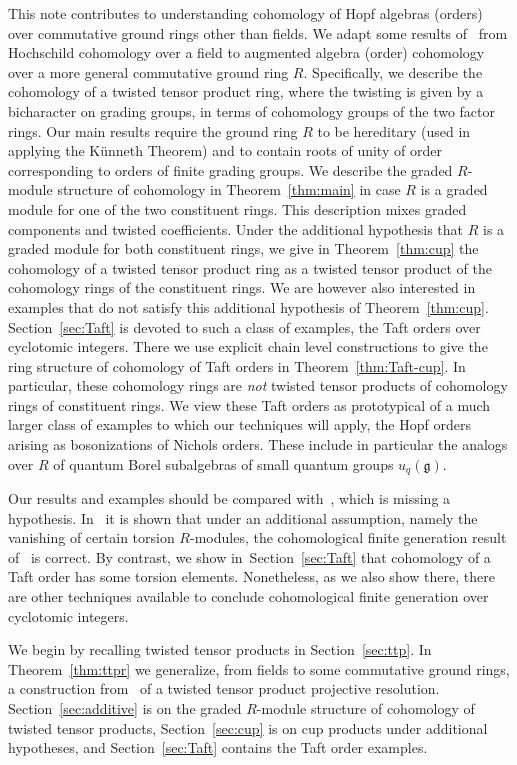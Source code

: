 \documentclass[11pt]{amsart}
\numberwithin{equation}{section}
\theoremstyle{definition}
\theoremstyle{remark}
\begin{document}
This note contributes to understanding 
cohomology of Hopf algebras (orders)
over commutative ground rings other than fields.
We adapt some results of~\cite{BW} from Hochschild cohomology
over a field to augmented algebra (order) cohomology over a 
more general commutative ground ring $R$.
Specifically, we describe the cohomology of a twisted tensor product ring,
where the twisting is given by a bicharacter on grading groups,
in terms of cohomology groups of the two factor rings.
Our main results require the ground ring $R$ to be hereditary 
(used in applying the K\"unneth Theorem) and to contain roots of unity 
of order corresponding to orders of finite grading groups.
We describe the
graded $R$-module structure of cohomology in Theorem~\ref{thm:main}
in case $R$ is a graded module for one of the two constituent rings.
This description mixes graded components and twisted coefficients.  
Under the additional hypothesis that $R$ is a graded module
for both constituent rings, we give in Theorem~\ref{thm:cup}
the cohomology of a twisted tensor product ring 
as a twisted tensor product of the cohomology rings of the constituent rings.
We are however also interested in examples
that do not satisfy this additional hypothesis of Theorem~\ref{thm:cup}.
Section~\ref{sec:Taft} is devoted to such a class of examples,
the Taft orders over cyclotomic integers.
There we use explicit chain level constructions to give the ring structure
of cohomology of Taft orders in Theorem~\ref{thm:Taft-cup}. 
In particular, these cohomology rings are {\em not} twisted tensor products
of cohomology rings of constituent rings. 
We view these Taft orders as prototypical of 
a much larger class of examples to which our techniques will apply, the
Hopf orders arising as bosonizations of Nichols orders.
These include in particular the analogs over $R$ of quantum Borel
subalgebras of small quantum groups $u_q(\mathfrak{g})$. 

Our results and examples should be compared with~\cite[Theorem 5.5]{NWW},
which is missing a hypothesis.
In~\cite{NWW-corrigendum} it is shown that under an additional assumption,
namely the vanishing of certain torsion $R$-modules,
the cohomological finite generation result of~\cite[Theorem 5.5]{NWW} is correct. 
By contrast, we show in~Section~\ref{sec:Taft}
that cohomology of a Taft order has some torsion elements. 
Nonetheless, as we also show there, there are other 
techniques available to conclude cohomological finite generation 
over cyclotomic integers. 

We begin by recalling twisted tensor products in Section~\ref{sec:ttp}.
In Theorem~\ref{thm:ttpr} we generalize,
from fields to some commutative ground rings,  
a construction from~\cite{Shepler-W}
of a twisted tensor product projective resolution.
Section~\ref{sec:additive} is on the graded $R$-module structure of cohomology
of twisted tensor products, Section~\ref{sec:cup} is on cup products
under additional hypotheses, and Section~\ref{sec:Taft} contains the Taft order examples.
\end{document}
